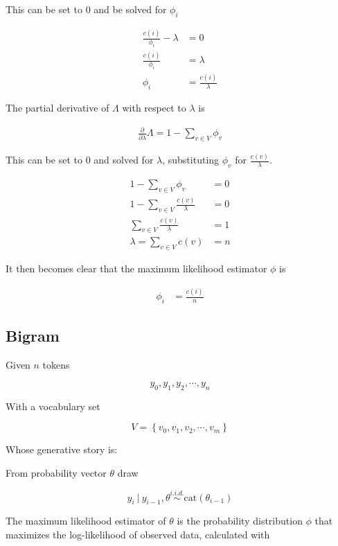 \documentclass[11pt]{article}
\begin{document}
This can be set to $0$ and be solved for $\phi_i$

\begin{align*}
\frac{c \left( i \right)}{\phi_i} - \lambda &= 0 \\
%
\frac{c \left( i \right)}{\phi_i} &= \lambda \\
%
\phi_{i} &= \frac{c \left( i \right)}{\lambda}
\end{align*}

The partial derivative of $\Lambda$ with respect to $\lambda$ is

\begin{align*}
\frac{\partial}{\partial \lambda} \Lambda = 1 - \sum \limits_{v \in V} \phi_{v}
\end{align*}

This can be set to $0$ and solved for $\lambda$, substituting $\phi_{v}$ for $ \frac{c \left( v \right)}{\lambda}$.

\begin{align*}
1 - \sum \limits_{v \in V} \phi_{v} &= 0 \\
%
1 - \sum \limits_{v \in V} \frac{c \left( v \right)}{\lambda} &= 0 \\
%
\sum \limits_{v \in V} \frac{c \left( v \right)}{\lambda} &= 1 \\
%
\lambda = \sum \limits_{v \in V} c \left( v \right) &= n
\end{align*}

It then becomes clear that the maximum likelihood estimator $\phi$ is

\begin{align*}
\phi_i &= \frac{c \left( i \right)}{n}
\end{align*}
%
%
%
\subsection{Bigram}

Given $n$ tokens

$$ y_0, y_1, y_2, \cdots, y_n $$

With a vocabulary set

$$ V = \left\{ v_0, v_1, v_2, \cdots, v_m \right\} $$

Whose generative story is:

From probability vector $\theta$ draw

$$ y_i \: \lvert \: y_{i - 1}, \theta \stackrel{i.i.d.}{\sim} \text{cat} \left( \theta_{i - 1} \right) $$

The maximum likelihood estimator of $\theta$ is the probability distribution $\phi$ that maximizes the log-likelihood of observed data, calculated with
\end{document}
